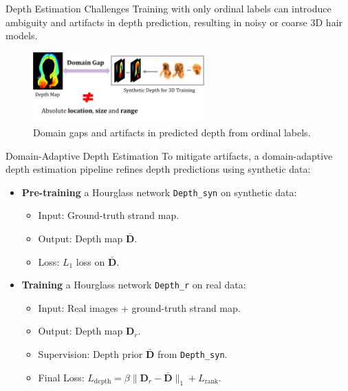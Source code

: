 \begin{frame}[t]{Depth Estimation Challenges}
    Training with only ordinal labels can introduce ambiguity and artifacts in depth prediction, resulting in noisy or coarse 3D hair models.
    \vspace{0.5em}
    \begin{figure}[t]
        \centering
        \includegraphics[width=0.6\textwidth]{assets/figures/method/depth/domain-gap.png}
        \caption{Domain gaps and artifacts in predicted depth from ordinal labels.}
        \label{fig:domain_gap}
    \end{figure}
\end{frame}

\begin{frame}[t]{Domain-Adaptive Depth Estimation}
    To mitigate artifacts, a domain-adaptive depth estimation pipeline refines depth predictions using synthetic data:
    \begin{itemize}
        \item \textbf{Pre-training} a Hourglass network \texttt{Depth\_syn} on synthetic data:
        \begin{itemize}
            \item Input: Ground-truth strand map.
            \item Output: Depth map $\bar{\mathbf{D}}$.
            \item Loss: $L_1$ loss on $\bar{\mathbf{D}}$.
        \end{itemize}
        \item \textbf{Training} a Hourglass network \texttt{Depth\_r} on real data:
        \begin{itemize}
            \item Input: Real images + ground-truth strand map.
            \item Output: Depth map $\mathbf{D}_r$.
            \item Supervision: Depth prior $\bar{\mathbf{D}}$ from \texttt{Depth\_syn}.
            \item Final Loss: $L_{\text{depth}} = \beta \|\mathbf{D}_r - \bar{\mathbf{D}}\|_1 + L_{\text{rank}}$.
        \end{itemize}
    \end{itemize}
\end{frame}

